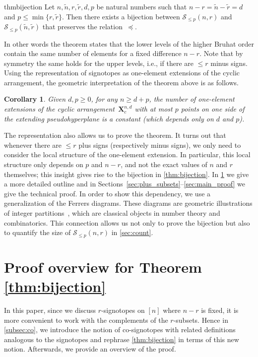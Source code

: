 \documentclass[a4paper,11pt]{amsart}
\newtheorem{corollary}[theorem]{Corollary}
\newcommand{\calS}{\mathcal{S}}
\newcommand{\tr}{\tilde{r}}
\begin{document}
\begin{restatable}{thm}{bijection}
\label{thm:bijection}
    Let $n, \tilde{n}, r, \tilde{r},d, p$ be natural numbers such that $n-r = \tilde{n}-\tilde{r} = d$ and $p \leq \min\{r,\tr\}$.
    Then there exists a bijection between $\calS_{\leq p}(n,r)$ and $\calS_{\leq p}(\tilde{n},\tilde{r})$ that preserves the relation~$\preceq$.
\end{restatable}


In other words the theorem states that the lower levels of the higher Bruhat order contain the same number of elements for a fixed difference $n-r$.
Note that by symmetry the same holds for the upper levels, i.e., if there are $\leq r$ minus signs. 
Using the representation of signotopes as one-element extensions of the cyclic arrangement, the geometric interpretation of the theorem above is as follows.

\begin{corollary}
    Given $d,p \geq 0$, for any $n \geq d+p$, the number of one-element extensions of the cyclic arrangement~$\mathbf{X}^{n,d}_c$ with at most $p$ points on one side of the extending pseudohyperplane is a constant (which depends only on $d$ and $p$).
\end{corollary}

The representation also allows us to prove the theorem.
It turns out that whenever there are $\leq r$ plus signs (respectively minus signs), we only need to consider the local structure of the one-element extension. 
In particular, this local structure only depends on $p$ and $n-r$, and not the exact values of $n$ and $r$ themselves; this insight gives rise to the bijection in \cref{thm:bijection}.
In \cref{sec:proof_outline} we give a more detailed outline and in Sections~\ref{sec:plus_subsets}--\ref{sec:main_proof} we give the technical proof.
In order to show this dependency, we use a generalization of the Ferrers diagrams.
These diagrams are geometric illustrations of integer partitions~\cite{MR2122332}, which are classical objects in number theory and combinatorics.
This connection allows us not only to prove the bijection but also to quantify the size of $\calS_{\leq p}(n,r)$ in \cref{sec:count}.

\section{Proof overview for Theorem \ref{thm:bijection}}
\label{sec:proof_outline}
In this paper, since we discuss $r$-signotopes on $[n]$ where $n-r$ is fixed, it is more convenient to work with the complements of the $r$-subsets.
Hence in \cref{subsec:co}, we introduce the notion of co-signotopes with related definitions analogous to the signotopes and rephrase \cref{thm:bijection} in terms of this new notion.
Afterwards, we provide an overview of the proof.
\end{document}
